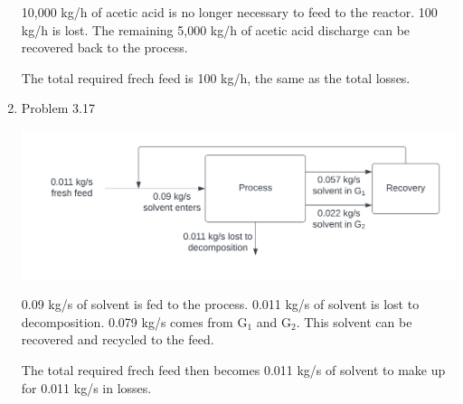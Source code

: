 \documentclass[12pt]{article}
\begin{document}
\begin{enumerate}
    10,000 kg/h of acetic acid is no longer necessary to feed to the reactor. 100 kg/h is lost. The remaining 5,000 kg/h of acetic acid discharge can be recovered back to the process.

    The total required frech feed is 100 kg/h, the same as the total losses.

\newpage
    \item Problem 3.17
    
    \includegraphics{assets/3.17.png}

    0.09 kg/s of solvent is fed to the process. 0.011 kg/s of solvent is lost to decomposition. 0.079 kg/s comes from G$_1$ and G$_2$. This solvent can be recovered and recycled to the feed. 

    The total required frech feed then becomes 0.011 kg/s of solvent to make up for 0.011 kg/s in losses.


\end{enumerate}
\end{document}
